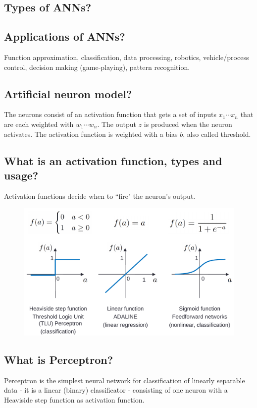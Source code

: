 \documentclass[12pt]{scrartcl}
\begin{document}
\subsection{Types of ANNs?}
\subsection{Applications of ANNs?}
Function approximation, classification, data processing, robotics, vehicle/process control, decision making (game-playing), pattern recognition.

\subsection{Artificial neuron model?}
The neurons consist of an activation function that gets a set of inputs $x_1 \cdots x_n$ that are each weighted with $w_1 \cdots w_n$. The output $z$ is produced when the neuron activates. The activation function is weighted with a bias $b$, also called threshold.

\subsection{What is an activation function, types and usage?}
Activation functions decide when to ``fire" the neuron's output.
\begin{figure}[htb]
  \begin{center}
  \includegraphics[scale=0.45]{activation_functions}
  \end{center}
  \vspace{-\baselineskip}
\end{figure}

\subsection{What is Perceptron?}
Perceptron is the simplest neural network for classification of linearly separable data - it is a linear (binary) classificator - consisting of one neuron with a Heaviside step function as activation function.
\end{document}

